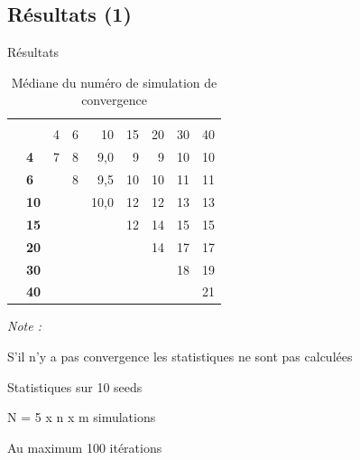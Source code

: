 \documentclass[10pt,xcolor=table,color={dvipsnames,usenames},ignorenonframetext,usepdftitle=false,french]{beamer}
\begin{document}
\hypertarget{ruxe9sultats-1-1}{%
\subsection{Résultats (1)}\label{ruxe9sultats-1-1}}

\begin{frame}{Résultats}
\protect\hypertarget{ruxe9sultats-5}{}

\begin{table}

\caption{\label{tab:tabq2convmed}Médiane du numéro de simulation de convergence}
\centering
\begin{threeparttable}
\begin{tabular}[t]{>{\bfseries}l|>{\bfseries}l|r|r|r|r|r|r|r}
\hline
\multicolumn{2}{c|}{ } & \multicolumn{7}{c}{m} \\
\cline{3-9}
  &    & 4 & 6 & 10 & 15 & 20 & 30 & 40\\
\hline
 & 4 & 7 & 8 & 9,0 & 9 & 9 & 10 & 10\\
\cline{2-9}
 & 6 &  & 8 & 9,5 & 10 & 10 & 11 & 11\\
\cline{2-9}
 & 10 &  &  & 10,0 & 12 & 12 & 13 & 13\\
\cline{2-9}
 & 15 &  &  &  & 12 & 14 & 15 & 15\\
\cline{2-9}
 & 20 &  &  &  &  & 14 & 17 & 17\\
\cline{2-9}
 & 30 &  &  &  &  &  & 18 & 19\\
\cline{2-9}
\multirow{-7}{*}{\raggedright\arraybackslash n} & 40 &  &  &  &  &  &  & 21\\
\hline
\end{tabular}
\begin{tablenotes}
\item \textit{Note : } 
\item S'il n'y a pas convergence les statistiques ne sont pas calculées
\item Statistiques sur 10 seeds
\item N = 5 x n x m simulations
\item Au maximum 100 itérations
\end{tablenotes}
\end{threeparttable}
\end{table}

\end{frame}
\end{document}
